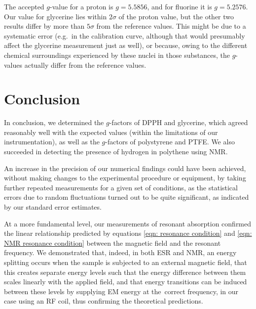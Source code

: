 \documentclass[a4paper]{jpconf}
\numberwithin{equation}{section}
\begin{document}
\begin{center}
	\vspace{5pt}
\end{center}

The accepted $g$-value for a proton is $g = 5.5856$, and for fluorine it is $g = 5.2576$. Our value for glycerine lies within $2\sigma$ of the proton value, but the other two results differ by more than $5\sigma$ from the reference values. This might be due to a systematic error (e.g.\ in the calibration curve, although that would presumably affect the glycerine measurement just as well), or because, owing to the different chemical surroundings experienced by these nuclei in those substances, the $g$-values actually differ from the reference values.

\section{Conclusion}

In conclusion, we determined the $g$-factors of DPPH and glycerine, which agreed reasonably well with the expected values (within the limitations of our instrumentation), as well as the $g$-factors of polystyrene and PTFE. We also succeeded in detecting the presence of hydrogen in polythene using NMR. 

An increase in the precision of our numerical findings could have been achieved, without making changes to the experimental procedure or equipment, by taking further repeated measurements for a given set of conditions, as the statistical errors due to random fluctuations turned out to be quite significant, as indicated by our standard error estimates. 

At a more fundamental level, our measurements of resonant absorption confirmed the linear relationship predicted by equations \eqref{eqn: resonance condition} and \eqref{eqn: NMR resonance condition} between the magnetic field and the resonant frequency. We demonstrated that, indeed, in both ESR and NMR, an energy splitting occurs when the sample is subjected to an external magnetic field, that this creates separate energy levels such that the energy difference between them scales linearly with the applied field, and that energy transitions can be induced between these levels by supplying EM energy at the~correct frequency, in our case using an RF coil, thus confirming the theoretical predictions. 
\end{document}
